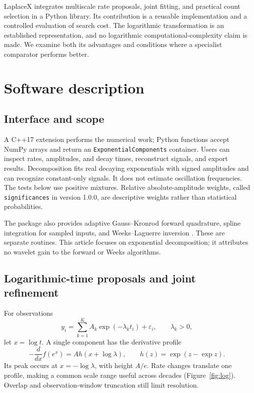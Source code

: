 \documentclass[preprint,11pt]{elsarticle}
\begin{document}
LaplaceX integrates multiscale rate proposals, joint fitting, and practical
count selection in a Python library. Its contribution is a reusable
implementation and a controlled evaluation of search cost. The logarithmic
transformation is an established representation, and no logarithmic
computational-complexity claim is made. We examine both its advantages and
conditions where a specialist comparator performs better.

\section{Software description}
\subsection{Interface and scope}
A C++17 extension performs the numerical work; Python functions accept NumPy
arrays and return an \texttt{ExponentialComponents} container. Users can inspect
rates, amplitudes, and decay times, reconstruct signals, and export results.
Decomposition fits real decaying exponentials with signed amplitudes and can
recognize constant-only signals. It does not estimate oscillation frequencies.
The tests below use positive mixtures. Relative absolute-amplitude weights,
called \texttt{significances} in version 1.0.0, are descriptive weights rather
than statistical probabilities.

The package also provides adaptive Gauss--Kronrod forward quadrature, spline
integration for sampled inputs, and Weeks--Laguerre inversion \cite{weeks}.
These are separate routines. This article focuses on exponential decomposition;
it attributes no wavelet gain to the forward or Weeks algorithms.

\subsection{Logarithmic-time proposals and joint refinement}
For observations
\begin{equation}
y_i=\sum_{k=1}^{K}A_k\exp(-\lambda_k t_i)+\varepsilon_i,
\qquad \lambda_k>0,
\label{eq:model}
\end{equation}
let $x=\log t$. A single component has the derivative profile
\begin{equation}
-\frac{d}{dx}f(e^x)=A h(x+\log\lambda),
\qquad h(z)=\exp(z-\exp z).
\label{eq:profile}
\end{equation}
Its peak occurs at $x=-\log\lambda$, with height $A/e$. Rate changes translate
one profile, making a common scale range useful across decades
(Figure~\ref{fig:log}). Overlap and observation-window truncation still limit
resolution.
\end{document}

